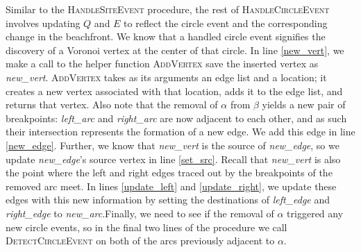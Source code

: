\documentclass[12pt,twoside]{reedthesis}
\begin{document}
    Similar to the \textsc{HandleSiteEvent} procedure, the rest of \textsc{HandleCircleEvent} involves updating $Q$ and $E$ to reflect the circle event and the corresponding change in the beachfront. We know that a handled circle event signifies the discovery of a Voronoi vertex at the center of that circle. In line \ref{new_vert}, we make a call to the helper function \textsc{AddVertex} save the inserted vertex as \textit{new\_vert}. \textsc{AddVertex} takes as its arguments an edge list and a location; it creates a new vertex associated with that location, adds it to the edge list, and returns that vertex. Also note that the removal of $\alpha$ from $\beta$ yields a new pair of breakpoints: \textit{left\_arc} and \textit{right\_arc} are now adjacent to each other, and as such their intersection represents the formation of a new edge. We add this edge in line \ref{new_edge}. Further, we know that \textit{new\_vert} is the source of \textit{new\_edge}, so we update \textit{new\_edge}'s source vertex in line \ref{set_src}. Recall that \textit{new\_vert} is also the point where the left and right edges traced out by the breakpoints of the removed arc meet. In lines \ref{update_left} and \ref{update_right}, we update these edges with this new information by setting the destinations of \textit{left\_edge} and \textit{right\_edge} to \textit{new\_arc}.Finally, we need to see if the removal of $\alpha$ triggered any new circle events, so in the final two lines of the procedure we call \textsc{DetectCircleEvent} on both of the arcs previously adjacent to $\alpha$.\par


\end{document}
